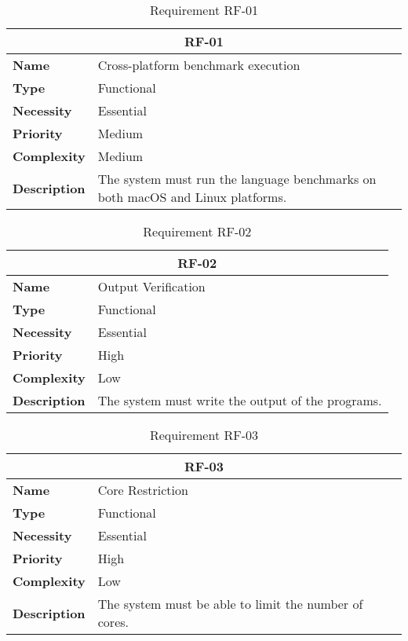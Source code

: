 \begin{table}[H]
    \centering
    \begin{tabular}{l p{10cm}}
        \toprule
        \multicolumn{2}{c}{\textbf{RF-01}} \\
        \toprule
        \textbf{Name}               & Cross-platform benchmark execution \\
        \textbf{Type}               & Functional \\
        \textbf{Necessity}          & Essential \\
        \textbf{Priority}           & Medium \\
        \textbf{Complexity}         & Medium \\
        \textbf{Description}        & The system must run the language benchmarks on both macOS and Linux platforms. \\
        \bottomrule
    \end{tabular}
\caption{Requirement RF-01}\label{tab:rf-01}
\end{table}

\begin{table}[H]
    \centering
    \begin{tabular}{l p{10cm}}
        \toprule
        \multicolumn{2}{c}{\textbf{RF-02}} \\
        \toprule
        \textbf{Name}               & Output Verification \\
        \textbf{Type}               & Functional \\
        \textbf{Necessity}          & Essential \\
        \textbf{Priority}           & High \\
        \textbf{Complexity}         & Low \\
        \textbf{Description}        & The system must write the output of the programs. \\
        \bottomrule
    \end{tabular}
\caption{Requirement RF-02}\label{tab:rf-02}
\end{table}

\begin{table}[H]
    \centering
    \begin{tabular}{l p{10cm}}
        \toprule
        \multicolumn{2}{c}{\textbf{RF-03}} \\
        \toprule
        \textbf{Name}               & Core Restriction \\
        \textbf{Type}               & Functional \\
        \textbf{Necessity}          & Essential \\
        \textbf{Priority}           & High \\
        \textbf{Complexity}         & Low \\
        \textbf{Description}        & The system must be able to limit the number of cores. \\
        \bottomrule
    \end{tabular}
\caption{Requirement RF-03}\label{tab:rf-03}
\end{table}


